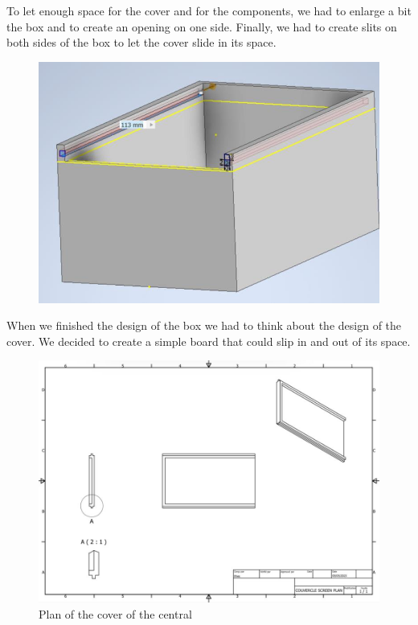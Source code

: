 To let enough space for the cover and for the components, we had to enlarge a bit the box and to create an opening on one side. Finally, we had to create slits on both sides of the box to let the cover slide in its space.
\begin{figure}[H]
    \centering
    \includegraphics[width=.7\textwidth]{images/casing/img27.jpg}
\end{figure}

When we finished the design of the box we had to think about the design of the cover. We decided to create a simple board that could slip in and out of its space.
\begin{figure}[H]
    \centering
    \includegraphics[width=.7\textwidth]{images/casing/img28.jpg}
    \caption{Plan of the cover of the central}
\end{figure}

